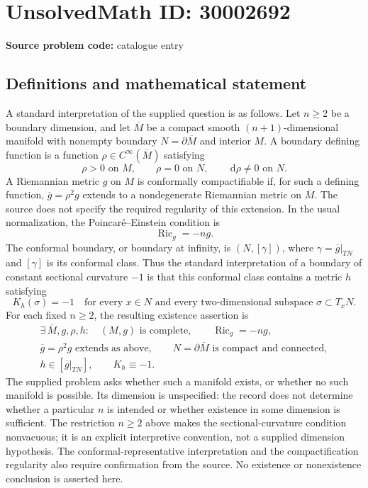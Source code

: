 \documentclass[11pt]{article}
\newcommand{\dd}{\,\mathrm{d}}
\begin{document}
\section*{UnsolvedMath ID: 30002692}
\textbf{Source problem code:} catalogue entry
\subsection{Definitions and mathematical statement}
A standard interpretation of the supplied question is as follows. Let \(n\geq 2\) be a boundary dimension, and let \(\overline M\) be a compact smooth \((n+1)\)-dimensional manifold with nonempty boundary \(N=\partial\overline M\) and interior \(M\). A boundary defining function is a function \(\rho\in C^\infty(\overline M)\) satisfying
\[
\rho>0\text{ on }M,\qquad \rho=0\text{ on }N,\qquad \dd\rho\neq0\text{ on }N.
\]
A Riemannian metric \(g\) on \(M\) is conformally compactifiable if, for such a defining function, \(\overline g=\rho^2g\) extends to a nondegenerate Riemannian metric on \(\overline M\). The source does not specify the required regularity of this extension. In the usual normalization, the Poincar\'e--Einstein condition is
\[
\operatorname{Ric}_g=-n g.
\]
The conformal boundary, or boundary at infinity, is \((N,[\gamma])\), where \(\gamma=\overline g|_{TN}\) and \([\gamma]\) is its conformal class. Thus the standard interpretation of a boundary of constant sectional curvature \(-1\) is that this conformal class contains a metric \(h\) satisfying
\[
K_h(\sigma)=-1
\quad\text{for every }x\in N\text{ and every two-dimensional subspace }\sigma\subset T_xN.
\]
For each fixed \(n\geq2\), the resulting existence assertion is
\[
\begin{gathered}
\exists\,\overline M,g,\rho,h:\quad
(M,g)\text{ is complete},\qquad \operatorname{Ric}_g=-ng,\\
\overline g=\rho^2g\text{ extends as above},\qquad
N=\partial\overline M\text{ is compact and connected},\\
h\in[\overline g|_{TN}],\qquad K_h\equiv-1.
\end{gathered}
\]
The supplied problem asks whether such a manifold exists, or whether no such manifold is possible. Its dimension is unspecified: the record does not determine whether a particular \(n\) is intended or whether existence in some dimension is sufficient. The restriction \(n\geq2\) above makes the sectional-curvature condition nonvacuous; it is an explicit interpretive convention, not a supplied dimension hypothesis. The conformal-representative interpretation and the compactification regularity also require confirmation from the source. No existence or nonexistence conclusion is asserted here.
\end{document}
